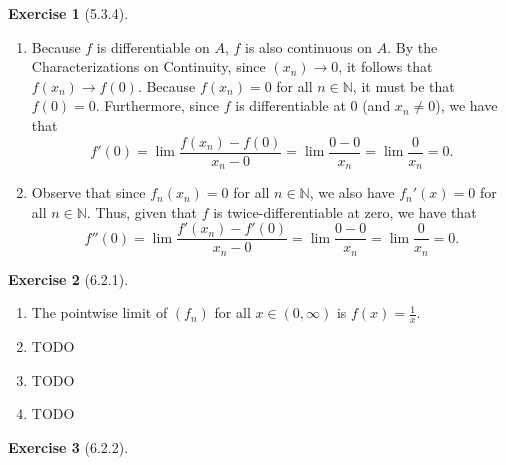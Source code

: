 \documentclass{amsart}
\theoremstyle{definition}
\newtheorem{exercise}{Exercise}
\newcommand{\N}{\mathbb{N}}
\begin{document}
\begin{exercise}[5.3.4]
  \begin{enumerate}[label={(\alph*)}]
    \item Because $f$ is differentiable on $A$, $f$ is also continuous on $A$.
      By the Characterizations on Continuity, since $(x_n) \to 0$, it follows
      that $f(x_n) \to f(0)$. Because $f(x_n) = 0$ for all $n \in \N$, it must
      be that $f(0) = 0$. Furthermore, since $f$ is differentiable at 0 (and
      $x_n \neq 0$), we have that
      \[
        f'(0) = \lim \frac{f(x_n) - f(0)}{x_n - 0} = \lim \frac{0 - 0}{x_n} =
        \lim \frac{0}{x_n} = 0.
      \]
    \item Observe that since $f_n(x_n) = 0$ for all $n \in \N$, we also have
      $f_n'(x) = 0$ for all $n \in \N$. Thus, given that $f$ is
      twice-differentiable at zero, we have that
      \[
        f''(0) = \lim \frac{f'(x_n) - f'(0)}{x_n - 0} = \lim \frac{0 - 0}{x_n} =
        \lim \frac{0}{x_n} = 0.
      \]
  \end{enumerate}
\end{exercise}

\begin{exercise}[6.2.1]
  \begin{enumerate}[label={(\alph*)}]
    \item The pointwise limit of $(f_n)$ for all $x \in (0, \infty)$ is $f(x) =
      \frac{1}{x}$.
    \item TODO
    \item TODO
    \item TODO
  \end{enumerate}
\end{exercise}

\begin{exercise}[6.2.2]
\end{exercise}
\end{document}
